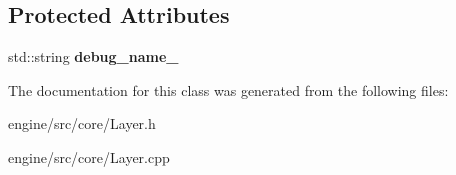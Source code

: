 \subsection*{Protected Attributes}
\begin{DoxyCompactItemize}
\item
\mbox{\label{classengine_1_1Layer_a9283719bf3b3d956809ef351a43ee16f}}
std\+::string {\bfseries debug\+\_\+name\+\_\+}
\end{DoxyCompactItemize}


The documentation for this class was generated from the following files\+:\begin{DoxyCompactItemize}
\item
engine/src/core/Layer.\+h\item
engine/src/core/Layer.\+cpp\end{DoxyCompactItemize}
